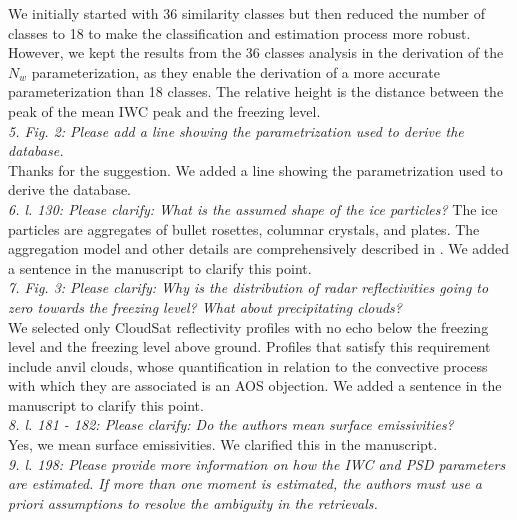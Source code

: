 \documentclass[12pt]{article}
\begin{document}
\newline
We initially started with 36 similarity classes but then reduced the number of classes to 18 to make the classification and 
estimation process more robust. However, we kept the results from the 36 classes analysis in the derivation of the $N_w$ parameterization,
as they enable the derivation of a more accurate parameterization than 18 classes. The relative height is the distance
between the peak of the mean IWC peak and the freezing level.\\
\newline
\textit{5. Fig. 2: Please add a line showing the parametrization used to derive the database.}\\
\newline
Thanks for the suggestion.  We added a line showing the parametrization used to derive the database.\\
\newline
\textit{6. l. 130: Please clarify: What is the assumed shape of the ice particles?}
The ice particles are aggregates of bullet rosettes, columnar crystals, and plates.  The aggregation model and 
other details are comprehensively described in \cite{hogan2014}. We added a sentence in the manuscript to clarify this point.\\
\newline
\textit{7. Fig. 3: Please clarify: Why is the distribution of radar reflectivities going to zero towards the freezing level? 
    What about precipitating clouds?}\\
\newline
We selected only CloudSat reflectivity profiles with no echo below the freezing level and the freezing level above ground.  
Profiles that satisfy this requirement include anvil clouds, whose quantification in relation to the convective process with which they are associated
is an AOS objection. We added a sentence in the manuscript to clarify this point.\\
\newline
\textit{8. l. 181 - 182: Please clarify: Do the authors mean surface emissivities?}\\
\newline
Yes, we mean surface emissivities.  We clarified this in the manuscript.\\
\newline
\textit{9. l. 198: Please provide more information on how the IWC and PSD parameters are estimated. If more than one moment
is estimated, the authors must use a priori assumptions to resolve the ambiguity in the retrievals.}\\
\end{document}
